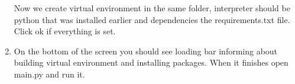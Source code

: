 \documentclass[a4paper,12pt]{book}
\begin{document}
\begin{enumerate}
\begin{minipage}[t]{\linewidth}
{		}		
		\medskip	
	\end{minipage}
	Now we create virtual environment in the same folder, interpreter should be python that was installed earlier and dependencies the requirements.txt file. Click ok if everything is set.
	\linebreak
	\item \begin{minipage}[t]{\linewidth}
		\raggedright
		\medskip	
	\end{minipage}
	On the bottom of the screen you should see loading bar informing about building virtual environment and installing packages. When it finishes open main.py and run it.
		

\end{enumerate}
\end{document}
